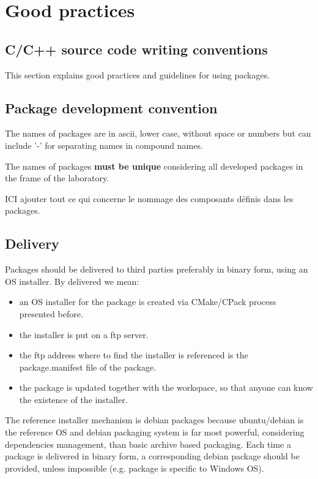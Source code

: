 \documentclass[12pt,a4paper]{article}
\begin{document}
\pagebreak

\section{Good practices}

\subsection{C/C++ source code writing conventions}

This section explains good practices and guidelines for using packages.

\subsection{Package development convention}

The names of packages are in ascii, lower case, without space or numbers but can include '-' for separating names in compound names.

The names of packages \textbf{must be unique} considering all developed packages in the frame of the laboratory.

ICI ajouter tout ce qui concerne le nommage des composants définis dans les packages.

\subsection{Delivery}

Packages should be delivered to third parties preferably in binary form, using an OS installer. By delivered we mean:
\begin{itemize}
\item an OS installer for the package is created via CMake/CPack process presented before.
\item the installer is put on a ftp server.
\item the ftp address where to find the installer is referenced is the package.manifest file of the package.
\item the package is updated together with the workspace, so that anyone can know the existence of the installer.
\end{itemize}

The reference installer mechanism is debian packages because ubuntu/debian is the reference OS and debian packaging system is far most powerful, considering dependencies management, than basic archive based packaging. Each time a package is delivered in binary form, a corresponding debian package should be provided, unless impossible (e.g. package is specific to Windows OS).
\end{document}
